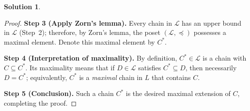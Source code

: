 \documentclass[12pt]{article}
\theoremstyle{definition} %
\newtheorem{solution}{Solution}
\theoremstyle{plain} %
\begin{document}
\begin{solution}
\begin{proof}
        \bigskip
        \textbf{Step 3 (Apply Zorn’s lemma).}
        Every chain in $\mathcal L$ has an upper bound in $\mathcal L$
        (Step~2); therefore, by Zorn’s lemma, the poset
        $(\mathcal L,\preceq)$ possesses a maximal element.
        Denote this maximal element by $C^{\ast}$.
        
        \bigskip
        \textbf{Step 4 (Interpretation of maximality).}
        By definition, $C^{\ast}\in\mathcal L$ is a chain with $C\subseteq C^{\ast}$.
        Its maximality means that if
        $D\in\mathcal L$ satisfies $C^{\ast}\subseteq D$,
        then necessarily $D=C^{\ast}$;
        equivalently, $C^{\ast}$ is a \emph{maximal} chain in $L$
        that contains $C$.
        
        \bigskip
        \textbf{Step 5 (Conclusion).}
        Such a chain $C^{\ast}$ is the desired maximal extension of $C$,
        completing the proof.
        \end{proof}
    \end{solution}
\end{document}
